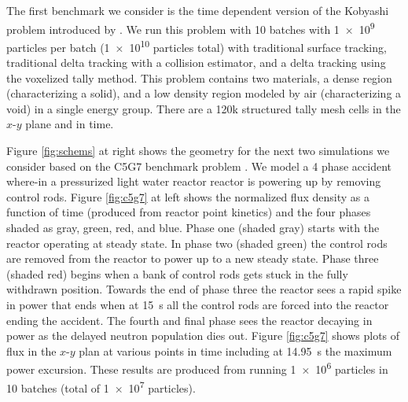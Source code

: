 The first benchmark we consider is the time dependent version of the Kobyashi problem \cite{Kobayashi2001} introduced by \cite{morgan_2025_monte}.
We run this problem with 10 batches with \num{1e9} particles per batch (\num{1e10} particles total) with traditional surface tracking, traditional delta tracking with a collision estimator, and a delta tracking using the voxelized tally method.
This problem contains two materials, a dense region (characterizing a solid), and a low density region modeled by air (characterizing a void) in a single energy group.
There are a 120k structured tally mesh cells in the $x$-$y$ plane and in time.

Figure \ref{fig:schems} at right shows the geometry for the next two simulations we consider based on the C5G7 benchmark problem \cite{jia_hou_oecdnea_2017}.
We model a 4 phase accident where-in a pressurized light water reactor reactor is powering up by removing control rods.
Figure \ref{fig:c5g7} at left shows the normalized flux density as a function of time (produced from reactor point kinetics) and the four phases shaded as gray, green, red, and blue.
Phase one (shaded gray) starts with the reactor operating at steady state.
In phase two (shaded green) the control rods are removed from the reactor to power up to a new steady state.
Phase three (shaded red) begins when a bank of control rods gets stuck in the fully withdrawn position.
Towards the end of phase three the reactor sees a rapid spike in power that ends when at \SI{15}{\s} all the control rods are forced into the reactor ending the accident.
The fourth and final phase sees the reactor decaying in power as the delayed neutron population dies out.
Figure \ref{fig:c5g7} shows plots of flux in the $x$-$y$ plan at various points in time including at \SI{14.95}{\s} the maximum power excursion.
These results are produced from running \num{1e6} particles in \num{10} batches (total of \num{1e7} particles).

